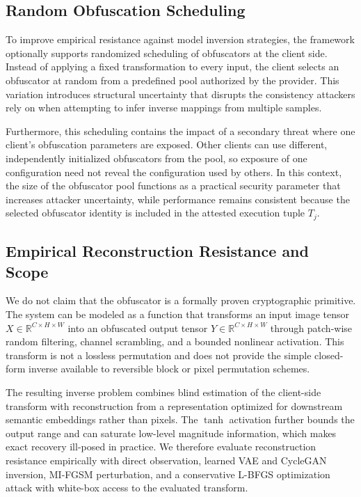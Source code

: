 \documentclass{ieeeaccess}
\newcommand{\rev}[1]{{\color{black}#1}}
\begin{document}
\subsection{\rev{Random Obfuscation Scheduling}}
\rev{To improve empirical resistance against model inversion strategies, the framework optionally supports randomized scheduling of obfuscators at the client side. Instead of applying a fixed transformation to every input, the client selects an obfuscator at random from a predefined pool authorized by the provider. This variation introduces structural uncertainty that disrupts the consistency attackers rely on when attempting to infer inverse mappings from multiple samples.}

\rev{Furthermore, this scheduling contains the impact of a secondary threat where one client's obfuscation parameters are exposed. Other clients can use different, independently initialized obfuscators from the pool, so exposure of one configuration need not reveal the configuration used by others. In this context, the size of the obfuscator pool functions as a practical security parameter that increases attacker uncertainty, while performance remains consistent because the selected obfuscator identity is included in the attested execution tuple $T_j$.}

\subsection{\rev{Empirical Reconstruction Resistance and Scope}}\label{sec:non-inv}

\rev{We do not claim that the obfuscator is a formally proven cryptographic primitive. The system can be modeled as a function that transforms an input image tensor $X \in \mathbb{R}^{C \times H \times W}$ into an obfuscated output tensor $Y \in \mathbb{R}^{C \times H \times W}$ through patch-wise random filtering, channel scrambling, and a bounded nonlinear activation. This transform is not a lossless permutation and does not provide the simple closed-form inverse available to reversible block or pixel permutation schemes.}

\rev{The resulting inverse problem combines blind estimation of the client-side transform with reconstruction from a representation optimized for downstream semantic embeddings rather than pixels. The $\tanh$ activation further bounds the output range and can saturate low-level magnitude information, which makes exact recovery ill-posed in practice. We therefore evaluate reconstruction resistance empirically with direct observation, learned VAE and CycleGAN inversion, MI-FGSM perturbation, and a conservative L-BFGS optimization attack with white-box access to the evaluated transform.}
\end{document}
